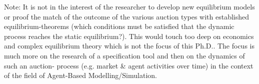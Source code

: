\documentclass{article}
\begin{document}
{\tiny Note: It is not in the interest of the researcher to develop new equilibrium models or proof the match of the outcome of the various auction types with established equilibrium-theorems (which conditions must be satisfied that the dynamic process reaches the static equilibrium?). This would touch too deep on economics and complex equilibrium theory which is not the focus of this Ph.D.. The focus is much more on the research of a specification tool and then on the dynamics of such an auction- process (e.g. market \& agent activities over time) in the context of the field of Agent-Based Modelling/Simulation.}






\end{document}
